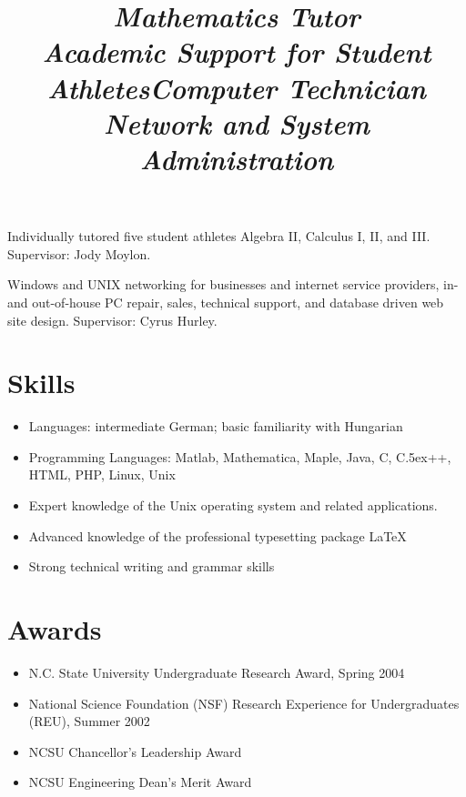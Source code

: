 \documentclass[margin,line,11pt,draft]{res}
\def\Cplusplus{{\rm C\raise.5ex\hbox{\small ++}}}
\begin{document}
\begin{resume}
\title{\em Mathematics Tutor \\ Academic Support for Student Athletes}
\location{}
\begin{position}
Individually tutored five student athletes Algebra II, Calculus I, II,
and III. Supervisor: Jody Moylon.
\end{position}

\title{\em Computer Technician \\ Network and System Administration}
\location{}
\begin{position}
Windows and UNIX networking for businesses and internet service providers,
in- and out-of-house PC repair, sales, technical support, and database driven
web site design. Supervisor: Cyrus Hurley.
\end{position}


\section{\sc Skills}
\begin{itemize}
\item Languages: intermediate German; basic familiarity with Hungarian
\item Programming Languages: Matlab, Mathematica, Maple, Java, C,
  \Cplusplus, HTML, PHP, Linux, Unix
\item Expert knowledge of the Unix operating system and related
  applications.
\item Advanced knowledge of the professional typesetting package \LaTeX
\item Strong technical writing and grammar skills
\end{itemize}

\section{\sc Awards}
\begin{itemize}
\item N.C. State University Undergraduate Research Award, Spring 2004
\item National Science Foundation (NSF) Research Experience for
  Undergraduates (REU), Summer 2002
\item NCSU Chancellor's Leadership Award %
\item NCSU Engineering Dean's Merit Award %
\end{itemize}


\end{resume}
\end{document}
